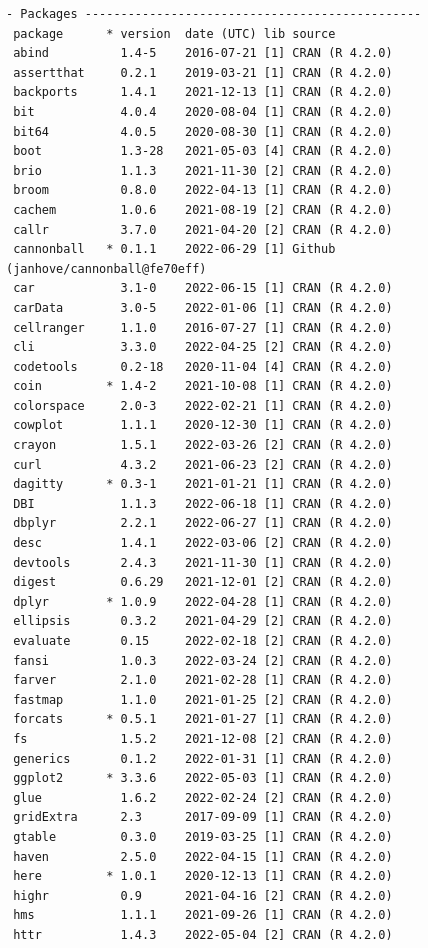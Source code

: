 \documentclass[oneside, 10pt]{book}\usepackage[]{graphicx}\usepackage[]{xcolor}
\makeatletter
\newenvironment{kframe}{%
 \def\at@end@of@kframe{}%
 \ifinner\ifhmode%
  \def\at@end@of@kframe{\end{minipage}}%
  \begin{minipage}{\columnwidth}%
 \fi\fi%
 \def\FrameCommand##1{\hskip\@totalleftmargin \hskip-\fboxsep
 \colorbox{shadecolor}{##1}\hskip-\fboxsep
     \hskip-\linewidth \hskip-\@totalleftmargin \hskip\columnwidth}%
 \MakeFramed {\advance\hsize-\width
   \@totalleftmargin\z@ \linewidth\hsize
   \@setminipage}}%
 {\par\unskip\endMakeFramed%
 \at@end@of@kframe}
\newenvironment{knitrout}{}{} %
\makeatother
\begin{document}
\begin{knitrout}
\begin{kframe}
\begin{verbatim}
- Packages -----------------------------------------------
 package      * version  date (UTC) lib source
 abind          1.4-5    2016-07-21 [1] CRAN (R 4.2.0)
 assertthat     0.2.1    2019-03-21 [1] CRAN (R 4.2.0)
 backports      1.4.1    2021-12-13 [1] CRAN (R 4.2.0)
 bit            4.0.4    2020-08-04 [1] CRAN (R 4.2.0)
 bit64          4.0.5    2020-08-30 [1] CRAN (R 4.2.0)
 boot           1.3-28   2021-05-03 [4] CRAN (R 4.2.0)
 brio           1.1.3    2021-11-30 [2] CRAN (R 4.2.0)
 broom          0.8.0    2022-04-13 [1] CRAN (R 4.2.0)
 cachem         1.0.6    2021-08-19 [2] CRAN (R 4.2.0)
 callr          3.7.0    2021-04-20 [2] CRAN (R 4.2.0)
 cannonball   * 0.1.1    2022-06-29 [1] Github (janhove/cannonball@fe70eff)
 car            3.1-0    2022-06-15 [1] CRAN (R 4.2.0)
 carData        3.0-5    2022-01-06 [1] CRAN (R 4.2.0)
 cellranger     1.1.0    2016-07-27 [1] CRAN (R 4.2.0)
 cli            3.3.0    2022-04-25 [2] CRAN (R 4.2.0)
 codetools      0.2-18   2020-11-04 [4] CRAN (R 4.2.0)
 coin         * 1.4-2    2021-10-08 [1] CRAN (R 4.2.0)
 colorspace     2.0-3    2022-02-21 [1] CRAN (R 4.2.0)
 cowplot        1.1.1    2020-12-30 [1] CRAN (R 4.2.0)
 crayon         1.5.1    2022-03-26 [2] CRAN (R 4.2.0)
 curl           4.3.2    2021-06-23 [2] CRAN (R 4.2.0)
 dagitty      * 0.3-1    2021-01-21 [1] CRAN (R 4.2.0)
 DBI            1.1.3    2022-06-18 [1] CRAN (R 4.2.0)
 dbplyr         2.2.1    2022-06-27 [1] CRAN (R 4.2.0)
 desc           1.4.1    2022-03-06 [2] CRAN (R 4.2.0)
 devtools       2.4.3    2021-11-30 [1] CRAN (R 4.2.0)
 digest         0.6.29   2021-12-01 [2] CRAN (R 4.2.0)
 dplyr        * 1.0.9    2022-04-28 [1] CRAN (R 4.2.0)
 ellipsis       0.3.2    2021-04-29 [2] CRAN (R 4.2.0)
 evaluate       0.15     2022-02-18 [2] CRAN (R 4.2.0)
 fansi          1.0.3    2022-03-24 [2] CRAN (R 4.2.0)
 farver         2.1.0    2021-02-28 [1] CRAN (R 4.2.0)
 fastmap        1.1.0    2021-01-25 [2] CRAN (R 4.2.0)
 forcats      * 0.5.1    2021-01-27 [1] CRAN (R 4.2.0)
 fs             1.5.2    2021-12-08 [2] CRAN (R 4.2.0)
 generics       0.1.2    2022-01-31 [1] CRAN (R 4.2.0)
 ggplot2      * 3.3.6    2022-05-03 [1] CRAN (R 4.2.0)
 glue           1.6.2    2022-02-24 [2] CRAN (R 4.2.0)
 gridExtra      2.3      2017-09-09 [1] CRAN (R 4.2.0)
 gtable         0.3.0    2019-03-25 [1] CRAN (R 4.2.0)
 haven          2.5.0    2022-04-15 [1] CRAN (R 4.2.0)
 here         * 1.0.1    2020-12-13 [1] CRAN (R 4.2.0)
 highr          0.9      2021-04-16 [2] CRAN (R 4.2.0)
 hms            1.1.1    2021-09-26 [1] CRAN (R 4.2.0)
 httr           1.4.3    2022-05-04 [2] CRAN (R 4.2.0)

\end{verbatim}
\end{kframe}
\end{knitrout}
\end{document}

